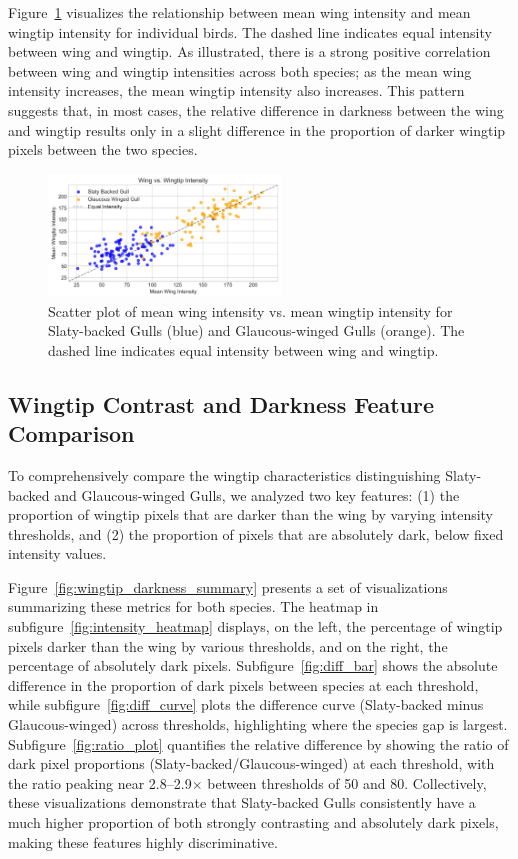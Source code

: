 \documentclass[a4paper,12pt]{report}
\begin{document}
Figure~\ref{fig:wing_vs_wingtip_intensity} visualizes the relationship between mean wing intensity and mean wingtip intensity for individual birds. The dashed line indicates equal intensity between wing and wingtip. As illustrated, there is a strong positive correlation between wing and wingtip intensities across both species; as the mean wing intensity increases, the mean wingtip intensity also increases. This pattern suggests that, in most cases, the relative difference in darkness between the wing and wingtip results only in a slight difference in the proportion of darker wingtip pixels between the two species.

\begin{figure}[h]
    \centering
    \includegraphics[width=0.55\textwidth]{images/REPORT_IMAGES_INTENSITY/I2/clusterwingwingtip.png}
    \caption{Scatter plot of mean wing intensity vs. mean wingtip intensity for Slaty-backed Gulls (blue) and Glaucous-winged Gulls (orange). The dashed line indicates equal intensity between wing and wingtip.}
    \label{fig:wing_vs_wingtip_intensity}
\end{figure}

\subsection{Wingtip Contrast and Darkness Feature Comparison}

To comprehensively compare the wingtip characteristics distinguishing Slaty-backed and Glaucous-winged Gulls, we analyzed two key features: (1) the proportion of wingtip pixels that are darker than the wing by varying intensity thresholds, and (2) the proportion of pixels that are absolutely dark, below fixed intensity values.

Figure~\ref{fig:wingtip_darkness_summary} presents a set of visualizations summarizing these metrics for both species. The heatmap in subfigure~\ref{fig:intensity_heatmap} displays, on the left, the percentage of wingtip pixels darker than the wing by various thresholds, and on the right, the percentage of absolutely dark pixels. Subfigure~\ref{fig:diff_bar} shows the absolute difference in the proportion of dark pixels between species at each threshold, while subfigure~\ref{fig:diff_curve} plots the difference curve (Slaty-backed minus Glaucous-winged) across thresholds, highlighting where the species gap is largest. Subfigure~\ref{fig:ratio_plot} quantifies the relative difference by showing the ratio of dark pixel proportions (Slaty-backed/Glaucous-winged) at each threshold, with the ratio peaking near 2.8--2.9$\times$ between thresholds of 50 and 80. Collectively, these visualizations demonstrate that Slaty-backed Gulls consistently have a much higher proportion of both strongly contrasting and absolutely dark pixels, making these features highly discriminative.
\end{document}
